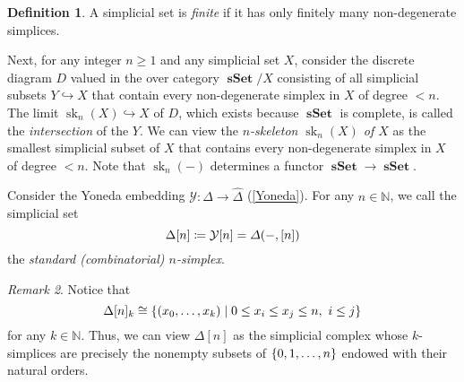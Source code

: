 \documentclass[10pt,letterpaper,cm]{nupset}
\theoremstyle{definition}
\newtheorem{definition}{Definition}[subsection]
\theoremstyle{theorem}
\theoremstyle{remark}
\newtheorem{remark}[definition]{Remark}
\newcommand{\0}{\mathbf{0}}
\newcommand{\1}{\mathbf{1}}
\newcommand{\2}{\mathbf{2}}
\DeclareMathOperator{\op}{op}
\DeclareMathOperator{\sset}{\mathbf{sSet}}
\DeclareMathOperator{\set}{\mathbf{Set}}
\DeclareMathOperator{\trr}{tr}
\DeclareMathOperator{\sk}{sk}
\newcommand{\N}{\mathbb N}
\begin{document}
\begin{definition}\label{finsimp}
A simplicial set is \textit{finite} if it has only finitely many non-degenerate simplices.
\end{definition}


\medskip

Next, for any integer $n\geq 1$ and any simplicial set $X$, consider the discrete diagram $D$ valued in the over category $\sset/X$ consisting of all simplicial subsets $Y \hookrightarrow X$  that contain every non-degenerate simplex in $X$ of degree $<n$. The limit $\sk_n(X) \hookrightarrow X$ of $D$, which exists because $\sset$ is complete, is called the \textit{intersection} of the $Y$. We can view the \textit{$n$-skeleton $\sk_n(X)$ of $X$} as the smallest simplicial subset of $X$ that contains every non-degenerate simplex in $X$ of degree $<n$. Note that $\sk_n({-})$ determines a functor $\sset \to \sset$.

\begin{comment}
Next, for any integer $n\geq 0$, consider the full subcategory $\varDelta_{\leq n}$ of $\varDelta$ on the set of all ordinals $\mleft[m\mright]$ such that $m\leq n$. We call a functor of the form $\varDelta_{\leq n}^{\op} \to \set$ an \textit{$n$-truncated simplicial set}. The full inclusion $\iota : \varDelta_{\leq n}^{\op} \hookrightarrow \varDelta^{\op}$ induces a \textit{truncation} functor 
\[
\trr_n : \sset \to \mleft[\varDelta_{\leq n}^{\op}, \set\mright], \ \quad K \mapsto K \circ \iota.
\]
This has a left adjoint $\sk_n : \mleft[\varDelta_{\leq n}^{\op}, \set\mright] \to \sset$ called the \textit{$n$-skeleton}, which is given pointwise by the formula 
\[
\sk_n{X}[p] = {\int^{[m]: \varDelta_{\leq n}} \varDelta\mleft(\mleft[p\mright], \mleft[m\mright]\mright)\times  X_m }.
\] (See \cref{coend} below for the meaning of $\int$.)
\end{comment}

\bigskip

Consider the Yoneda embedding $\mathcal{Y}: \varDelta \to \widehat{\varDelta}$ (\cref{Yoneda}). For any $n\in \N$, we call the simplicial set
\[
\Delta[n]\coloneqq \mathcal{Y}{\mleft[n\mright]} =\varDelta\mleft({-}, \mleft[n\mright]\mright)
\] the \textit{standard (combinatorial) $n$-simplex}. 

\begin{remark}\label{std}
Notice that 
\[
\Delta[n]_k \cong \mleft\{\mleft(x_0, \ldots, x_k\mright) \mid 0\leq x_i \leq x_j \leq n, \ i \leq j\mright\}
\]  for any $k \in \N$. Thus, we can view $\Delta[n]$ as the simplicial complex whose $k$-simplices are precisely the nonempty subsets of $\mleft\{0, 1, \ldots, n\mright\}$ endowed with their natural orders.
\end{remark}
\end{document}
